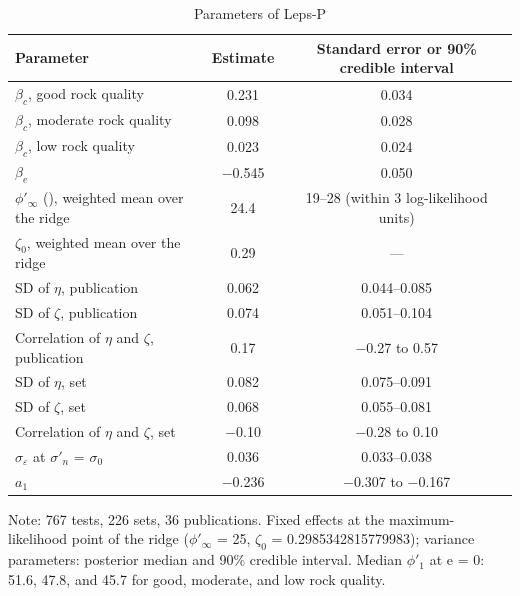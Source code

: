 \documentclass[Journal,letterpaper]{ascelike-new}
\begin{document}
\begin{table}
\caption{Parameters of Leps-P}
\label{tab:1}
\centering\small
\renewcommand{\arraystretch}{1.15}
\begin{tabular}{lcc}
\hline\hline
Parameter & Estimate & Standard error or 90\% credible interval \\
\hline
$\beta_c$, good rock quality & 0.231 & 0.034 \\
$\beta_c$, moderate rock quality & 0.098 & 0.028 \\
$\beta_c$, low rock quality & 0.023 & 0.024 \\
$\beta_e$ & $-$0.545 & 0.050 \\
$\phi'_\infty$ (\textdegree{}), weighted mean over the ridge & 24.4 & 19--28 (within 3 log-likelihood units) \\
$\zeta_0$, weighted mean over the ridge & 0.29 & --- \\
SD of $\eta$, publication & 0.062 & 0.044--0.085 \\
SD of $\zeta$, publication & 0.074 & 0.051--0.104 \\
Correlation of $\eta$ and $\zeta$, publication & 0.17 & $-$0.27 to 0.57 \\
SD of $\eta$, set & 0.082 & 0.075--0.091 \\
SD of $\zeta$, set & 0.068 & 0.055--0.081 \\
Correlation of $\eta$ and $\zeta$, set & $-$0.10 & $-$0.28 to 0.10 \\
$\sigma_\varepsilon$ at $\sigma'_n$ = $\sigma_0$ & 0.036 & 0.033--0.038 \\
$a_1$ & $-$0.236 & $-$0.307 to $-$0.167 \\
\hline\hline
\end{tabular}
\par\vspace{4pt}\parbox{\linewidth}{\footnotesize Note: 767 tests, 226 sets, 36 publications. Fixed effects at the maximum-likelihood point of the ridge ($\phi'_\infty$ = 25\textdegree{}, $\zeta_0$ = 0.2985342815779983); variance parameters: posterior median and 90\% credible interval. Median $\phi'_1$ at e = 0: 51.6\textdegree{}, 47.8\textdegree{}, and 45.7\textdegree{} for good, moderate, and low rock quality.}
\end{table}
\end{document}

